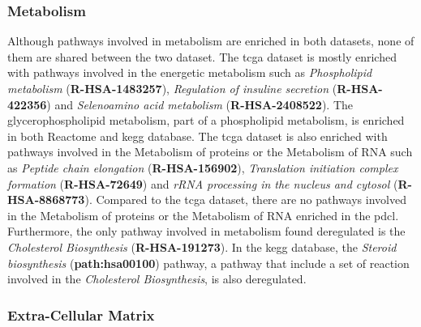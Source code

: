 \subsubsection{Metabolism}

Although pathways involved in metabolism are enriched in both datasets, none of them are shared between the two dataset.
The \acrshort{tcga} dataset is mostly enriched with pathways involved in the energetic metabolism such as \textit{Phospholipid metabolism} (\textbf{R-HSA-1483257}), \textit{Regulation of insuline secretion} (\textbf{R-HSA-422356}) and \textit{Selenoamino acid metabolism} (\textbf{R-HSA-2408522}).
The glycerophospholipid metabolism, part of a phospholipid metabolism, is enriched in both Reactome and \acrshort{kegg} database.
The \acrshort{tcga} dataset is also enriched with pathways involved in the Metabolism of proteins or the Metabolism of RNA such as \textit{Peptide chain elongation} (\textbf{R-HSA-156902}), \textit{Translation initiation complex formation} (\textbf{R-HSA-72649}) and \textit{rRNA processing in the nucleus and cytosol} (\textbf{R-HSA-8868773}).
Compared to the \acrshort{tcga} dataset, there are no pathways involved in the Metabolism of proteins or the Metabolism of RNA enriched in the \acrshort{pdcl}.
Furthermore, the only pathway involved in metabolism found deregulated is the \textit{Cholesterol Biosynthesis} (\textbf{R-HSA-191273}).
In the \acrshort{kegg} database, the \textit{Steroid biosynthesis} (\textbf{path:hsa00100}) pathway, a pathway that include a set of reaction involved in the \textit{Cholesterol Biosynthesis}, is also deregulated.

\subsubsection{Extra-Cellular Matrix}

